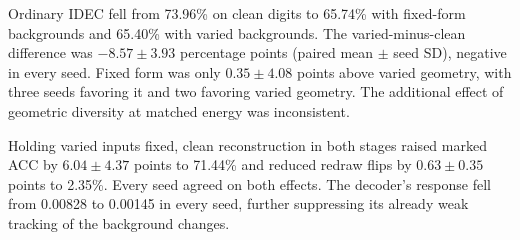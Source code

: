 Ordinary IDEC fell from 73.96\% on clean digits to 65.74\% with fixed-form backgrounds and 65.40\% with varied backgrounds. The varied-minus-clean difference was $-8.57\pm3.93$ percentage points (paired mean $\pm$ seed SD), negative in every seed. Fixed form was only $0.35\pm4.08$ points above varied geometry, with three seeds favoring it and two favoring varied geometry. The additional effect of geometric diversity at matched energy was inconsistent.

Holding varied inputs fixed, clean reconstruction in both stages raised marked ACC by $6.04\pm4.37$ points to 71.44\% and reduced redraw flips by $0.63\pm0.35$ points to 2.35\%. Every seed agreed on both effects. The decoder's response fell from 0.00828 to 0.00145 in every seed, further suppressing its already weak tracking of the background changes.
